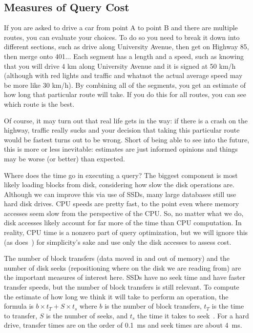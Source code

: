 \subsection*{Measures of Query Cost}

If you are asked to drive a car from point A to point B and there are multiple routes, you can evaluate your choices. To do so you need to break it down into different sections, such as drive along University Avenue, then get on Highway 85, then merge onto 401... Each segment has a length and a speed, such as knowing that you will drive 4 km along University Avenue and it is signed at 50 km/h (although with red lights and traffic and whatnot the actual average speed may be more like 30 km/h). By combining all of the segments, you get an estimate of how long that particular route will take. If you do this for all routes, you can see which route is the best. 

Of course, it may turn out that real life gets in the way: if there is a crash on the highway, traffic really sucks and your decision that taking this particular route would be fastest turns out to be wrong. Short of being able to see into the future, this is more or less inevitable: estimates are just informed opinions and things may be worse (or better) than expected. 

Where does the time go in executing a query? The biggest component is most likely loading blocks from disk, considering how slow the disk operations are. Although we can improve this via use of SSDs, many large databases still use hard disk drives. CPU speeds are pretty fast, to the point even where memory accesses seem slow from the perspective of the CPU. So, no matter what we do, disk accesses likely account for far more of the time than CPU computation. In reality, CPU time is a nonzero part of query optimization, but we will ignore this (as does~\cite{dsc}) for simplicity's sake and use only the disk accesses to assess cost.

The number of block transfers (data moved in and out of memory) and the number of disk seeks (repositioning where on the disk we are reading from) are the important measures of interest here. SSDs have no seek time and have faster transfer speeds, but the number of block transfers is still relevant. To compute the estimate of how long we think it will take to perform an operation, the formula is $b \times t_{T} + S \times t_{s}$ where $b$ is the number of block transfers, $t_{T}$ is the time to transfer, $S$ is the number of seeks, and $t_{s}$ the time it takes to seek~\cite{dsc}. For a hard drive, transfer times are on the order of 0.1~ms and seek times are about 4~ms.

